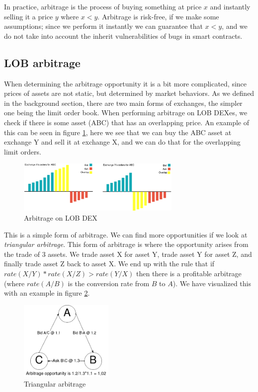 In practice, arbitrage is the process of buying something at price $x$
and instantly selling it a price $y$ where $x<y$. Arbitrage is
risk-free, if we make some assumptions; since we perform it instantly
we can guarantee that $x<y$, and we do not take into account the
inherit vulnerabilities of bugs in smart contracts.

\subsection{LOB arbitrage}
When determining the arbitrage opportunity it is a bit more
complicated, since prices of assets are not static, but determined by
market behaviors. As we defined in the background section, there are
two main forms of exchanges, the simpler one being the limit order
book. When performing arbitrage on LOB DEXes, we check if there is some
asset (ABC) that has an overlapping price. An example of this can be
seen in figure \ref{fig:ArbLOB}, here we see that we can buy the ABC
asset at exchange Y and sell it at exchange X, and we can do that for
the overlapping limit orders.
\begin{figure}[h]
\centering
\includegraphics[width=0.7\textwidth]{assests/Flash-loans-Arbitrage-Overlap-1}
\caption{Arbitrage on LOB DEX}
\label{fig:ArbLOB}
\end{figure}
This is a simple form of arbitrage. We can find more opportunities if
we look at \textit{triangular arbitrage}. This form of arbitrage is
where the opportunity arises from the trade of 3 assets. We trade asset X for
asset Y, trade asset Y for asset Z, and finally trade asset Z back to asset X.
We end up with the rule that if $rate(X/Y)*rate(X/Z)>rate(Y/X)$ then there is a
profitable arbitrage (where $rate(A/B)$ is the conversion rate from $B$ to $A$).
We have visualized this with an example in figure \ref{fig:ArbTrig}.
\begin{figure}[h]
\centering
\includegraphics[width=0.4\textwidth]{assests/Flash-loans-Arbitrage-triangular}
\caption{Triangular arbitrage}
\label{fig:ArbTrig}
\end{figure}

